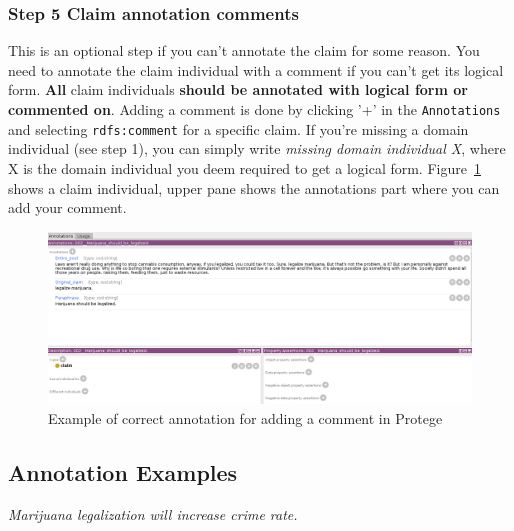 \subsubsection{Step 5 Claim annotation comments}

This is an optional step if you can't annotate the claim for some reason. You
need to annotate the claim individual with a comment if you can't get its
logical form. \textbf{All} claim individuals \textbf{should be annotated with logical form or
commented on}. Adding a comment is done by clicking '+' in the \texttt{Annotations} and
selecting \texttt{rdfs:comment} for a specific claim. If you're missing a domain
individual (see step 1), you can simply write \textit{missing domain individual X},
where X is the domain individual you deem required to get a logical form. 
Figure~\ref{fig:comment_example} shows 
a claim individual, upper pane shows the annotations part where
you can add your comment. 

\begin{figure}
	\includegraphics[scale=0.35]{comment.png}
	\caption{Example of correct annotation for adding a comment in Protege}
	\label{fig:comment_example}
\end{figure}

\subsection{Annotation Examples}

\begin{mydef}
 \textit{Marijuana legalization will increase crime rate. }
\end{mydef}

